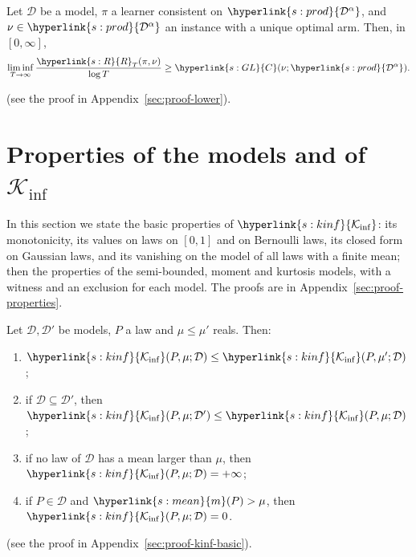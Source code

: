 \documentclass[11pt]{article}
\newcommand{\sy}[2]{{\hyperlink{#1}{#2}}}
\newcommand{\mean}{\sy{s:mean}{m}}
\newcommand{\Kinf}{\sy{s:kinf}{\mathcal{K}_{\inf}}}
\newcommand{\powc}[1]{\sy{s:prod}{#1^{\alpha}}}
\newcommand{\Reg}{\sy{s:R}{R}}
\newcommand{\GL}{\sy{s:GL}{C}}
\begin{document}
\begin{corollary}\label{cor:lower}
Let $\mathcal D$ be a model, $\pi$ a learner consistent on $\powc{\mathcal D}$, and
$\nu\in\powc{\mathcal D}$ an instance with a unique optimal arm. Then, in $[0,\infty]$,
\begin{equation*}
  \liminf_{T\to\infty}\frac{\Reg_T(\pi,\nu)}{\log T}\ge\GL(\nu;\powc{\mathcal D}).
\end{equation*}
\end{corollary}
(see the proof in Appendix~\ref{sec:proof-lower}).

\section{Properties of the models and of \texorpdfstring{$\mathcal{K}_{\inf}$}{Kinf}}\label{sec:properties}

In this section we state the basic properties of $\Kinf$: its monotonicity, its
values on laws on $[0,1]$ and on Bernoulli laws, its closed form on Gaussian laws, and its vanishing
on the model of all laws with a finite mean; then the properties of the semi-bounded, moment and
kurtosis models, with a witness and an exclusion for each model. The proofs are in
Appendix~\ref{sec:proof-properties}.

\begin{lemma}\label{lem:kinf-basic}
Let $\mathcal D,\mathcal D'$ be models, $P$ a law and $\mu\le\mu'$ reals. Then:
\begin{enumerate}[label=(\roman*)]
  \item $\Kinf(P,\mu;\mathcal D)\le\Kinf(P,\mu';\mathcal D)$;
  \item if $\mathcal D\subseteq\mathcal D'$, then $\Kinf(P,\mu;\mathcal D')\le\Kinf(P,\mu;\mathcal D)$;
  \item if no law of $\mathcal D$ has a mean larger than $\mu$, then $\Kinf(P,\mu;\mathcal D)=+\infty$;
  \item if $P\in\mathcal D$ and $\mean(P)>\mu$, then $\Kinf(P,\mu;\mathcal D)=0$.
\end{enumerate}
\end{lemma}
(see the proof in Appendix~\ref{sec:proof-kinf-basic}).
\end{document}
